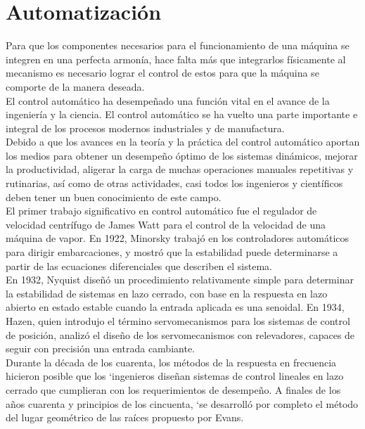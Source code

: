 \section{Automatización}
Para que los componentes necesarios para el funcionamiento de una máquina se integren en una perfecta armonía, hace falta más que integrarlos físicamente al mecanismo es necesario lograr el control de estos para que la máquina se comporte de la manera deseada.\\

El control automático ha desempeñado una función vital en el avance de la ingeniería y la ciencia. El control automático se ha vuelto una parte importante e integral de los procesos modernos industriales y de manufactura.\\

Debido a que los avances en la teoría y la práctica del control automático aportan los medios para obtener un desempeño óptimo de los sistemas dinámicos, mejorar la productividad, aligerar la carga de muchas operaciones manuales repetitivas y rutinarias, así como de otras actividades, casi todos los ingenieros y científicos deben tener un buen conocimiento de este campo.\\

El primer trabajo significativo en control automático fue el regulador de velocidad centrífugo de James Watt para el control de la velocidad de una máquina de vapor. En 1922, Minorsky trabajó en los controladores automáticos para dirigir embarcaciones, y mostró que la estabilidad puede determinarse a partir de las ecuaciones diferenciales que describen el sistema.\\

En 1932, Nyquist diseñó un procedimiento relativamente simple para determinar la estabilidad de sistemas en lazo cerrado, con base en la respuesta en lazo abierto en estado estable cuando la entrada aplicada es una senoidal. En 1934, Hazen, quien introdujo el término servomecanismos para los sistemas de control de posición, analizó el diseño de los servomecanismos con relevadores, capaces de seguir con precisión una entrada cambiante.\\

Durante la década de los cuarenta, los métodos de la respuesta en frecuencia hicieron posible que los ‘ingenieros diseñan sistemas de control lineales en lazo cerrado que cumplieran con los requerimientos de desempeño. A finales de los años cuarenta y principios de los cincuenta, ‘se desarrolló por completo el método del lugar geométrico de las raíces propuesto por Evans.\\

